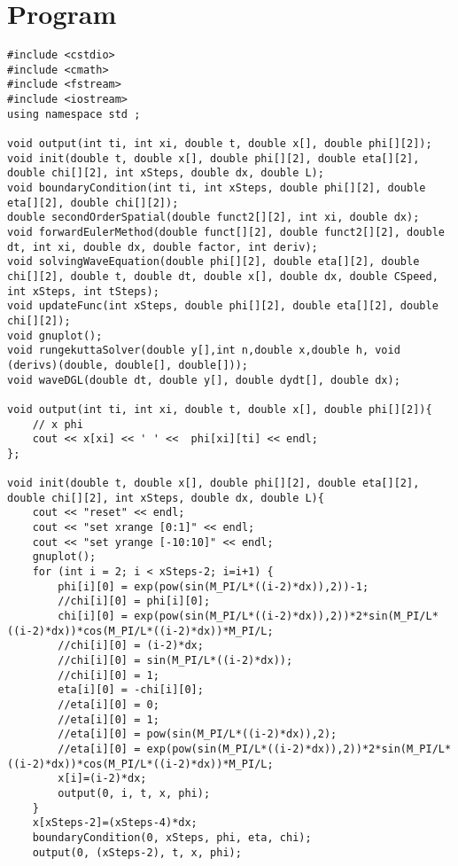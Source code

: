 \documentclass[10pt,fleqn,reqno,a4paper]{article}
\begin{document}
\section{Program}
\begin{verbatim}
#include <cstdio>
#include <cmath>
#include <fstream>
#include <iostream>
using namespace std ;

void output(int ti, int xi, double t, double x[], double phi[][2]);
void init(double t, double x[], double phi[][2], double eta[][2], double chi[][2], int xSteps, double dx, double L);
void boundaryCondition(int ti, int xSteps, double phi[][2], double eta[][2], double chi[][2]);
double secondOrderSpatial(double funct2[][2], int xi, double dx);
void forwardEulerMethod(double funct[][2], double funct2[][2], double dt, int xi, double dx, double factor, int deriv);
void solvingWaveEquation(double phi[][2], double eta[][2], double chi[][2], double t, double dt, double x[], double dx, double CSpeed, int xSteps, int tSteps);
void updateFunc(int xSteps, double phi[][2], double eta[][2], double chi[][2]);
void gnuplot();
void rungekuttaSolver(double y[],int n,double x,double h, void (derivs)(double, double[], double[]));
void waveDGL(double dt, double y[], double dydt[], double dx);

void output(int ti, int xi, double t, double x[], double phi[][2]){
    // x phi
    cout << x[xi] << ' ' <<  phi[xi][ti] << endl;
};

void init(double t, double x[], double phi[][2], double eta[][2], double chi[][2], int xSteps, double dx, double L){
    cout << "reset" << endl;
    cout << "set xrange [0:1]" << endl;
    cout << "set yrange [-10:10]" << endl;
    gnuplot();
    for (int i = 2; i < xSteps-2; i=i+1) {
        phi[i][0] = exp(pow(sin(M_PI/L*((i-2)*dx)),2))-1;
        //chi[i][0] = phi[i][0];
        chi[i][0] = exp(pow(sin(M_PI/L*((i-2)*dx)),2))*2*sin(M_PI/L*((i-2)*dx))*cos(M_PI/L*((i-2)*dx))*M_PI/L;
        //chi[i][0] = (i-2)*dx;
        //chi[i][0] = sin(M_PI/L*((i-2)*dx));
        //chi[i][0] = 1;
        eta[i][0] = -chi[i][0];
        //eta[i][0] = 0;
        //eta[i][0] = 1;
        //eta[i][0] = pow(sin(M_PI/L*((i-2)*dx)),2);
        //eta[i][0] = exp(pow(sin(M_PI/L*((i-2)*dx)),2))*2*sin(M_PI/L*((i-2)*dx))*cos(M_PI/L*((i-2)*dx))*M_PI/L;
        x[i]=(i-2)*dx;
        output(0, i, t, x, phi);
	}
	x[xSteps-2]=(xSteps-4)*dx;
    boundaryCondition(0, xSteps, phi, eta, chi);
    output(0, (xSteps-2), t, x, phi);


\end{verbatim}
\end{document}
